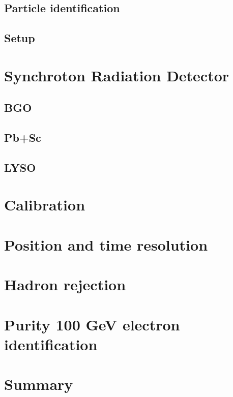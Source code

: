 \subsection{Particle identification}

\subsection{Setup}
\section{Synchroton Radiation Detector }
\subsection{BGO}
\subsection{Pb+Sc}
\subsection{LYSO}
\section{Calibration}
\section{Position and time resolution}
\section{Hadron rejection}
\section{Purity 100 GeV electron identification}
\section{Summary}


